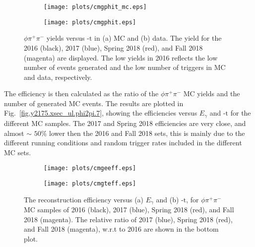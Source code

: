 \begin{figure}[H]
    \centering
    \begin{subfigure}[b]{0.5\textwidth}
        \texttt{[image: plots/cmgphit\_mc.eps]}
        \caption{}
        \label{fig.y2175.xsec_ul.phi2pi.8.a}
    \end{subfigure}\hfill
    \begin{subfigure}[b]{0.5\textwidth}
        \texttt{[image: plots/cmgphit.eps]}
        \caption{}
        \label{fig.y2175.xsec_ul.phi2pi.8.b}
    \end{subfigure}
    \caption{\label{fig.y2175.xsec_ul.phi2pi.8}$\phi \pi^+ \pi^-$ yields versus $\mbox{-t}$ in (a) MC and (b) data. The yield for the 2016 (black), 2017 (blue), Spring 2018 (red), and Fall 2018 (magenta) are displayed. The low yields in 2016 reflects the low number of events generated and the low number of triggers in MC and data, respectively.}
\end{figure}

The efficiency is then calculated as the ratio of the $\phi \pi^+ \pi^-$ MC yields and the number of generated MC events. The results are plotted in Fig.~\ref{fig.y2175.xsec_ul.phi2pi.7}, showing the efficiencies versus $E_{\gamma}$ and $\mbox{-t}$ for the different MC samples. The 2017 and Spring 2018 efficiencies are very close, and almost $\sim$ $50\%$ lower then the 2016 and Fall 2018 sets, this is mainly due to the different running conditions and random trigger rates included in the different MC sets.

\begin{figure}[H]
    \centering
    \begin{subfigure}[b]{0.5\textwidth}
        \texttt{[image: plots/cmgeeff.eps]}
        \caption{}
        \label{fig.y2175.xsec_ul.phi2pi.9.a}
    \end{subfigure}\hfill
    \begin{subfigure}[b]{0.5\textwidth}
        \texttt{[image: plots/cmgteff.eps]}
        \caption{}
        \label{fig.y2175.xsec_ul.phi2pi.9.b}
    \end{subfigure}
    \caption{\label{fig.y2175.xsec_ul.phi2pi.9}The reconstruction efficiency versus (a) $E_{\gamma}$ and (b) $\mbox{-t}$, for $\phi \pi^+ \pi^-$ MC samples of 2016 (black), 2017 (blue), Spring 2018 (red), and Fall 2018 (magenta). The relative ratio of 2017 (blue), Spring 2018 (red), and Fall 2018 (magenta), w.r.t to 2016 are shown in the bottom plot.}
\end{figure}

